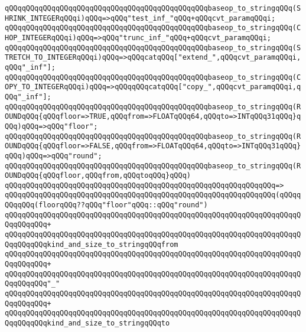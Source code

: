 \verb|qQQqqQQqqQQqqQQqqQQqqQQqqQQqqQQqqQQqqQQqqQQqqQQqbaseop_to_stringqQQq(SHRINK_INTEGERqQQqi)qQQq=>qQQq"test_inf_"qQQq+qQQqcvt_paramqQQqi;|\newline
\verb|qQQqqQQqqQQqqQQqqQQqqQQqqQQqqQQqqQQqqQQqqQQqqQQqbaseop_to_stringqQQq(CHOP_INTEGERqQQqi)qQQq=>qQQq"trunc_inf_"qQQq+qQQqcvt_paramqQQqi;|\newline
\verb|qQQqqQQqqQQqqQQqqQQqqQQqqQQqqQQqqQQqqQQqqQQqqQQqbaseop_to_stringqQQq(STRETCH_TO_INTEGERqQQqi)qQQq=>qQQqcatqQQq["extend_",qQQqcvt_paramqQQqi,qQQq"_inf"];|\newline
\verb|qQQqqQQqqQQqqQQqqQQqqQQqqQQqqQQqqQQqqQQqqQQqqQQqbaseop_to_stringqQQq(COPY_TO_INTEGERqQQqi)qQQq=>qQQqqQQqcatqQQq["copy_",qQQqcvt_paramqQQqi,qQQq"_inf"];|\newline
\newline
\verb|qQQqqQQqqQQqqQQqqQQqqQQqqQQqqQQqqQQqqQQqqQQqqQQqbaseop_to_stringqQQq(ROUNDqQQq{qQQqfloor=>TRUE,qQQqfrom=>FLOATqQQq64,qQQqto=>INTqQQq31qQQq}qQQq)qQQq=>qQQq"floor";|\newline
\verb|qQQqqQQqqQQqqQQqqQQqqQQqqQQqqQQqqQQqqQQqqQQqqQQqbaseop_to_stringqQQq(ROUNDqQQq{qQQqfloor=>FALSE,qQQqfrom=>FLOATqQQq64,qQQqto=>INTqQQq31qQQq}qQQq)qQQq=>qQQq"round";|\newline
\newline
\verb|qQQqqQQqqQQqqQQqqQQqqQQqqQQqqQQqqQQqqQQqqQQqqQQqbaseop_to_stringqQQq(ROUNDqQQq{qQQqfloor,qQQqfrom,qQQqtoqQQq}qQQq)|\newline
\verb|qQQqqQQqqQQqqQQqqQQqqQQqqQQqqQQqqQQqqQQqqQQqqQQqqQQqqQQqqQQqqQQq=>|\newline
\verb|qQQqqQQqqQQqqQQqqQQqqQQqqQQqqQQqqQQqqQQqqQQqqQQqqQQqqQQqqQQqqQQq(qQQqqQQqqQQq(floorqQQq??qQQq"floor"qQQq::qQQq"round")|\newline
\verb|qQQqqQQqqQQqqQQqqQQqqQQqqQQqqQQqqQQqqQQqqQQqqQQqqQQqqQQqqQQqqQQqqQQqqQQqqQQqqQQq+|\newline
\verb|qQQqqQQqqQQqqQQqqQQqqQQqqQQqqQQqqQQqqQQqqQQqqQQqqQQqqQQqqQQqqQQqqQQqqQQqqQQqqQQqkind_and_size_to_stringqQQqfrom|\newline
\verb|qQQqqQQqqQQqqQQqqQQqqQQqqQQqqQQqqQQqqQQqqQQqqQQqqQQqqQQqqQQqqQQqqQQqqQQqqQQqqQQq+|\newline
\verb|qQQqqQQqqQQqqQQqqQQqqQQqqQQqqQQqqQQqqQQqqQQqqQQqqQQqqQQqqQQqqQQqqQQqqQQqqQQqqQQq"_"|\newline
\verb|qQQqqQQqqQQqqQQqqQQqqQQqqQQqqQQqqQQqqQQqqQQqqQQqqQQqqQQqqQQqqQQqqQQqqQQqqQQqqQQq+|\newline
\verb|qQQqqQQqqQQqqQQqqQQqqQQqqQQqqQQqqQQqqQQqqQQqqQQqqQQqqQQqqQQqqQQqqQQqqQQqqQQqqQQqkind_and_size_to_stringqQQqto|\newline

